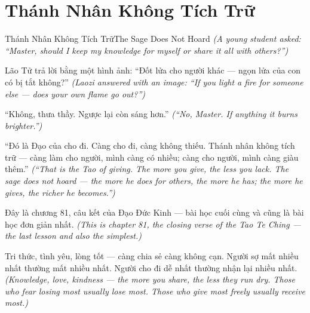 \section{Thánh Nhân Không Tích Trữ}
\begin{truyen}{Thánh Nhân Không Tích Trữ}{The Sage Does Not Hoard}
\textit{(A young student asked: ``Master, should I keep my knowledge for myself or share it all with others?'')}

Lão Tử trả lời bằng một hình ảnh: ``Đốt lửa cho người khác — ngọn lửa của con có bị tắt không?''
\textit{(Laozi answered with an image: ``If you light a fire for someone else — does your own flame go out?'')}

``Không, thưa thầy. Ngược lại còn sáng hơn.''
\textit{(``No, Master. If anything it burns brighter.'')}

``Đó là Đạo của cho đi. Càng cho đi, càng không thiếu. Thánh nhân không tích trữ — càng làm cho người, mình càng có nhiều; càng cho người, mình càng giàu thêm.''
\textit{(``That is the Tao of giving. The more you give, the less you lack. The sage does not hoard — the more he does for others, the more he has; the more he gives, the richer he becomes.'')}

Đây là chương 81, câu kết của Đạo Đức Kinh — bài học cuối cùng và cũng là bài học đơn giản nhất.
\textit{(This is chapter 81, the closing verse of the Tao Te Ching — the last lesson and also the simplest.)}

\end{truyen}

\begin{baihoc}
Tri thức, tình yêu, lòng tốt — càng chia sẻ càng không cạn. Người sợ mất nhiều nhất thường mất nhiều nhất. Người cho đi dễ nhất thường nhận lại nhiều nhất.
\textit{(Knowledge, love, kindness — the more you share, the less they run dry. Those who fear losing most usually lose most. Those who give most freely usually receive most.)}
\end{baihoc}
\ngancach

